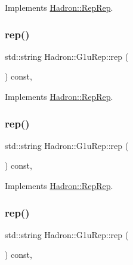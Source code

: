 Implements \mbox{\hyperlink{structHadron_1_1RepRep_ab3213025f6de249f7095892109575fde}{Hadron\+::\+Rep\+Rep}}.

\mbox{\label{structHadron_1_1G1uRep_a3c25822b246f892ed1eef8aeb4ae8252}} 
\subsubsection{\texorpdfstring{rep()}{rep()}\hspace{0.1cm}{\footnotesize\ttfamily [2/5]}}
{\footnotesize\ttfamily std\+::string Hadron\+::\+G1u\+Rep\+::rep (\begin{DoxyParamCaption}{ }\end{DoxyParamCaption}) const\hspace{0.3cm}{\ttfamily [inline]}, {\ttfamily [virtual]}}



Implements \mbox{\hyperlink{structHadron_1_1RepRep_ab3213025f6de249f7095892109575fde}{Hadron\+::\+Rep\+Rep}}.

\mbox{\label{structHadron_1_1G1uRep_a3c25822b246f892ed1eef8aeb4ae8252}} 
\subsubsection{\texorpdfstring{rep()}{rep()}\hspace{0.1cm}{\footnotesize\ttfamily [3/5]}}
{\footnotesize\ttfamily std\+::string Hadron\+::\+G1u\+Rep\+::rep (\begin{DoxyParamCaption}{ }\end{DoxyParamCaption}) const\hspace{0.3cm}{\ttfamily [inline]}, {\ttfamily [virtual]}}



Implements \mbox{\hyperlink{structHadron_1_1RepRep_ab3213025f6de249f7095892109575fde}{Hadron\+::\+Rep\+Rep}}.

\mbox{\label{structHadron_1_1G1uRep_a3c25822b246f892ed1eef8aeb4ae8252}} 
\subsubsection{\texorpdfstring{rep()}{rep()}\hspace{0.1cm}{\footnotesize\ttfamily [4/5]}}
{\footnotesize\ttfamily std\+::string Hadron\+::\+G1u\+Rep\+::rep (\begin{DoxyParamCaption}{ }\end{DoxyParamCaption}) const\hspace{0.3cm}{\ttfamily [inline]}, {\ttfamily [virtual]}}



